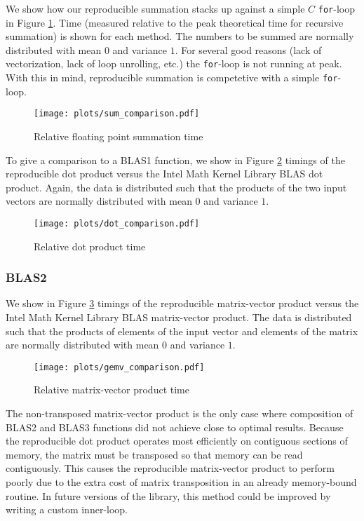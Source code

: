     We show how our reproducible summation stacks up against a simple $C$ \texttt{for}-loop in Figure \ref{fig:forloop_timings}. Time (measured relative to the peak theoretical time for recursive summation) is shown for each method. The numbers to be summed are normally distributed with mean $0$ and variance $1$. For several good reasons (lack of vectorization, lack of loop unrolling, etc.) the \texttt{for}-loop is not running at peak. With this in mind, reproducible summation is competetive with a simple \texttt{for}-loop.
  \begin{figure}[H]
  \begin{center}
  \texttt{[image: plots/sum\_comparison.pdf]}
  \caption{Relative floating point summation time}
  \label{fig:forloop_timings}
  \end{center}
  \end{figure}
    To give a comparison to a BLAS1 function, we show in Figure \ref{fig:dot_timings} timings of the reproducible dot product versus the Intel Math Kernel Library \cite{MKL} BLAS dot product. Again, the data is distributed such that the products of the two input vectors are normally distributed with mean $0$ and variance $1$.
  \begin{figure}[H]
  \begin{center}
  \texttt{[image: plots/dot\_comparison.pdf]}
  \caption{Relative dot product time}
  \label{fig:dot_timings}
  \end{center}
  \end{figure}
  \subsubsection{BLAS2}
    We show in Figure \ref{fig:gemv_timings} timings of the reproducible matrix-vector product versus the Intel Math Kernel Library \cite{MKL} BLAS matrix-vector product. The data is distributed such that the products of elements of the input vector and elements of the matrix are normally distributed with mean $0$ and variance $1$.
  \begin{figure}[H]
  \begin{center}
  \texttt{[image: plots/gemv\_comparison.pdf]}
  \caption{Relative matrix-vector product time}
  \label{fig:gemv_timings}
  \end{center}
  \end{figure}
  The non-transposed matrix-vector product is the only case where composition of BLAS2 and BLAS3 functions did not achieve close to optimal results. Because the reproducible dot product operates most efficiently on contiguous sections of memory, the matrix must be transposed so that memory can be read contiguously. This causes the reproducible matrix-vector product to perform poorly due to the extra cost of matrix transposition in an already memory-bound routine. In future versions of the library, this method could be improved by writing a custom inner-loop.

